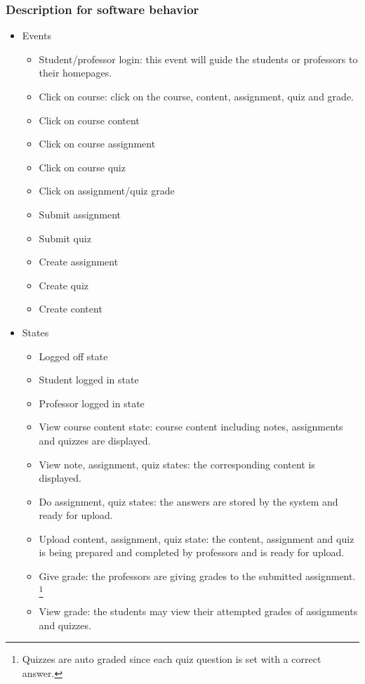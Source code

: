 \documentclass[paper=a4, fontsize=11pt]{scrartcl}
\numberwithin{equation}{section}		%
\numberwithin{figure}{section}			%
\numberwithin{table}{section}				%
\begin{document}
\subsubsection{Description for software behavior}

\begin{itemize}
	\item Events
	\begin{itemize}
		\item Student/professor login: this event will guide the students or professors to their homepages.
		\item Click on course: click on the course, content, assignment, quiz and grade.
		\item Click on course content
		\item Click on course assignment
		\item Click on course quiz
		\item Click on assignment/quiz grade
		\item Submit assignment
		\item Submit quiz
		\item Create assignment
		\item Create quiz
		\item Create content
	\end{itemize}
	\item States
	\begin{itemize}
		\item Logged off state
		\item Student logged in state
		\item Professor logged in state
		\item View course content state: course content including notes, assignments and quizzes are displayed.
		\item View note, assignment, quiz states: the corresponding content is displayed.
		\item Do assignment, quiz states: the answers are stored by the system and ready for upload.
		\item Upload content, assignment, quiz state: the content, assignment and quiz is being prepared and completed by professors and is ready for upload.
		\item Give grade: the professors are giving grades to the submitted assignment. \footnote{Quizzes are auto graded since each quiz question is set with a correct answer.}
		\item View grade: the students may view their attempted grades of assignments and quizzes.
	\end{itemize}
\end{itemize}
\end{document}
